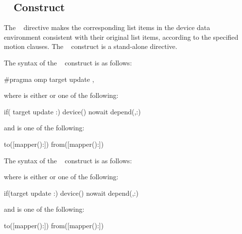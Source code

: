 \subsection{~ Construct}
\label{subsec:target update Construct}
\summary
The ~ directive makes the corresponding list items in the device data
environment consistent with their original list items, according to the specified motion
clauses. The ~ construct is a stand-alone directive.


\syntax
\begin{ccppspecific}
The syntax of the ~ construct is as follows:

\begin{ompcPragma}
#pragma omp target update \plc{clause[ [ [},\plc{] clause] ... ] new-line}
\end{ompcPragma}
where  is either  or one of the following:

\begin{indentedcodelist}
if(\plc{[} target update :\plc{] scalar-expression})
device()
nowait
depend(\plc{[depend-modifier},\plc{] dependence-type }:)
\end{indentedcodelist}

and  is one of the following:

\begin{indentedcodelist}
to([mapper():])
from([mapper():])
\end{indentedcodelist}
\end{ccppspecific}

\begin{fortranspecific}
The syntax of the ~ construct is as follows:


where  is either  or one of the following:

\begin{indentedcodelist}
if(\plc{[}target update :\plc{] scalar-logical-expression})
device()
nowait
depend(\plc{[depend-modifier},\plc{] dependence-type }:)
\end{indentedcodelist}

and  is one of the following:

\begin{indentedcodelist}
to([mapper():])
from([mapper():])
\end{indentedcodelist}
\end{fortranspecific}


